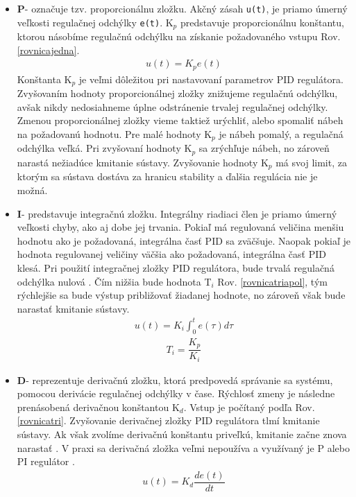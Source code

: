 \begin{itemize}
	\item \textbf{P}- označuje tzv. proporcionálnu zložku. Akčný zásah \verb|u(t)|, je priamo úmerný veľkosti regulačnej odchýlky \verb|e(t)|. K$_p$ predstavuje proporcionálnu konštantu, ktorou násobíme regulačnú odchýlku na získanie požadovaného vstupu Rov. \ref{rovnicajedna}. 
	\begin{align}
		\label{rovnicajedna}
		u(t)=K_p e(t)
	\end{align}
	Konštanta K$_p$ je veľmi dôležitou pri nastavovaní parametrov PID regulátora. Zvyšovaním hodnoty proporcionálnej zložky znižujeme regulačnú odchýlku, avšak nikdy nedosiahneme úplne odstránenie trvalej regulačnej odchýlky. Zmenou proporcionálnej zložky vieme taktiež urýchliť, alebo spomaliť nábeh na požadovanú hodnotu. Pre malé hodnoty K$_p$ je nábeh pomalý, a regulačná odchýlka veľká. Pri zvyšovaní hodnoty K$_p$ sa zrýchľuje nábeh, no zároveň narastá nežiadúce kmitanie sústavy. Zvyšovanie hodnoty K$_p$ má svoj limit, za ktorým sa sústava dostáva za hranicu stability a ďalšia regulácia nie je možná. 
	
	\item \textbf{I}- predstavuje integračnú zložku. Integrálny riadiaci člen je priamo úmerný veľkosti chyby, ako aj dobe jej trvania. Pokiaľ má regulovaná veličina menšiu hodnotu ako je požadovaná, integrálna časť PID sa zväčšuje. Naopak pokiaľ je hodnota regulovanej veličiny väčšia ako požadovaná, integrálna časť PID klesá. Pri použití integračnej zložky PID regulátora, bude trvalá regulačná odchýlka nulová \cite{PIDcko}. Čím nižšia bude hodnota T$_i$ Rov. \ref{rovnicatriapol}, tým rýchlejšie sa bude výstup približovať žiadanej hodnote, no zároveň však bude narastať kmitanie sústavy.   
	\begin{align}
		\label{rovnicadva}
		u(t)=K_i  \int_{0}^{t} e(\tau)d\tau  
	\end{align}
	\begin{align}
	\label{rovnicatriapol}
        T_i = \dfrac{K_p}{K_i}
    \end{align}
	
	\item \textbf{D}- reprezentuje derivačnú zložku, ktorá predpovedá správanie sa systému, pomocou derivácie regulačnej odchýlky v čase. Rýchlosť zmeny je následne prenásobená derivačnou konštantou K$_d$. Vstup je počítaný podľa Rov. \ref{rovnicatri}. Zvyšovanie derivačnej zložky PID regulátora tlmí kmitanie sústavy. Ak však zvolíme derivačnú konštantu priveľkú, kmitanie začne znova narastať \cite{PIDcko}. V praxi sa derivačná zložka veľmi nepoužíva a využívaný je P alebo PI regulátor \cite{1453566}. 
	\begin{align}
		\label{rovnicatri}
		u(t)=K_d  \dfrac{de(t)}{dt}
	\end{align}

\end{itemize}

